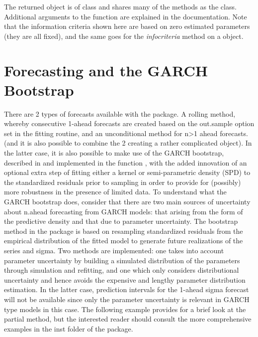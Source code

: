 The returned object is of class \verb@uGARCHfilter@ and shares many of the methods
as the \verb@uGARCHfit@ class. Additional arguments to the function are explained
in the documentation. Note that the information criteria shown here are based on
zero estimated parameters (they are all fixed), and the same goes for the
\emph{infocriteria} method on a \verb@uGARCHfilter@ object.

\section{Forecasting and the GARCH Bootstrap}\label{section:forecasting}
There are 2 types of forecasts available with the package. A rolling method,
whereby consecutive 1-ahead forecasts are created based on the out.sample option
set in the fitting routine, and an unconditional method for n>1 ahead forecasts.
(and it is also possible to combine the 2 creating a rather complicated object).
In the latter case, it is also possible to make use of the GARCH bootstrap,
described in \cite{Pascual2006} and implemented in the function \verb@ugarchboot@,
with the added innovation of an optional extra  step of fitting either a kernel
or semi-parametric density (SPD) to the standardized residuals prior to sampling
in order to provide for (possibly) more robustness  in the presence of limited data.
To understand what the GARCH bootstrap does, consider that there are two main
sources of uncertainty about n.ahead forecasting from GARCH models: that arising
from the form of the predictive density and that due to parameter uncertainty.
The bootstrap method in the \verb@rugarch@ package is based on
resampling standardized residuals from the empirical distribution of the fitted model
to generate future realizations of the series and sigma. Two methods are implemented:
one takes into account parameter uncertainty by building a simulated distribution
of the parameters through simulation and refitting, and one which only considers
distributional uncertainty and hence avoids the expensive and lengthy parameter
distribution estimation. In the latter case, prediction intervals for the 1-ahead sigma
forecast will not be available since only the parameter uncertainty is relevant in
GARCH type models in this case. The following example provides for a brief look at the
partial method, but the interested reader should consult the more comprehensive examples
in the inst folder of the package.
